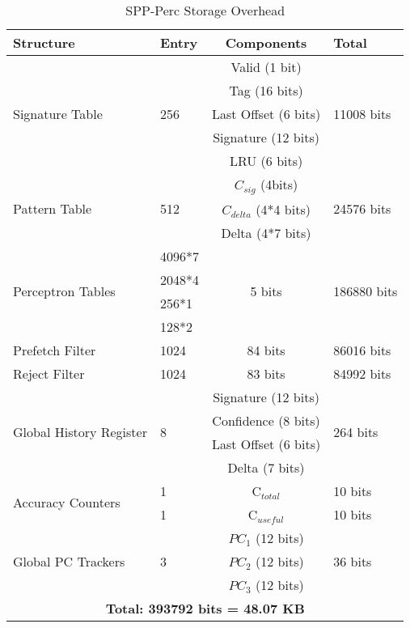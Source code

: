 \documentclass{sig-alternate}
\begin{document}
\begin{table}[]
    \centering
    \begin{tabular}{|p{1.5cm}|p{1cm}|c|p{1.5cm}|}
    \hline
        \textbf{Structure} &
        \textbf{Entry} &
        \textbf{Components} &
        \textbf{Total} \\
    \hline
        \multirow{5}{1.5cm}{Signature Table} & \multirow{5}{1.5cm}{256} & Valid (1 bit) & \multirow{5}{1cm}{11008  bits}\\
        & & Tag (16 bits) &\\
        & & Last Offset (6 bits) &\\  
        & & Signature (12 bits) &\\
        & & LRU (6 bits) &\\
    \hline
        \multirow{3}{1.5cm}{Pattern Table} & \multirow{3}{1.5cm}{512} & $C_{sig}$ (4bits) &\multirow{3}{1cm}{24576 bits}\\
        & & $C_{delta}$ (4*4 bits) &\\
        & & Delta (4*7 bits) &\\
    \hline
        \multirow{4}{1.5cm}{Perceptron Tables} & 4096*7 & \multirow{4}{1.5cm}{5 bits} & \multirow{4}{1.5cm}{186880 bits}\\
        & 2048*4 & &\\
        & 256*1 & &\\
        & 128*2 & &\\
    \hline
        \multirow{2}{1.5cm}{Prefetch Filter \footnotemark[1]} & \multirow{2}{1.5cm}{1024} & \multirow{2}{1.5cm}{84 bits} & \multirow{2}{1.5cm}{86016 bits}\\
        & & &\\
    \hline
     \multirow{2}{1.5cm}{Reject Filter \footnotemark[2]} & \multirow{2}{1.5cm}{1024} & \multirow{2}{1.5cm}{83 bits} & \multirow{2}{1.5cm}{84992 bits}\\
        & & &\\
    \hline
        \multirow{4}{1.5cm}{Global History Register} & \multirow{4}{1.5cm}{8} & Signature (12 bits) & \multirow{4}{1.5cm}{264 bits}\\
        & & Confidence (8 bits) & \\
        & & Last Offset (6 bits) & \\
        & & Delta (7 bits) & \\
    \hline
        \multirow{2}{1.5cm}{Accuracy Counters} & 1 & C$_{total}$ & 10 bits\\
        & 1 & C$_{useful}$ & 10 bits\\
    \hline
        \multirow{3}{1.5cm}{Global PC Trackers} & \multirow{3}{1cm}{3} & $PC_1$ (12 bits)& \multirow{3}{1.cm}{36 bits}\\
        & & $PC_2$ (12 bits) &\\
        & & $PC_3$ (12 bits) &\\
    \hline
        \multicolumn{4}{|c|}{\textbf{Total: 393792 bits = 48.07 KB}}\\
    \hline
    \end{tabular}
    \caption{SPP-Perc Storage Overhead}
    \label{tab:SPPPerc_overhead}
\end{table}
\end{document}
